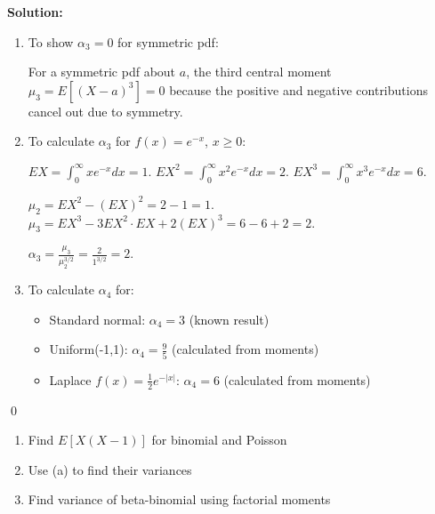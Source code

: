 \noindent\textbf{Solution:}
\begin{enumerate}[label=(\alph*)]
    \item To show $\alpha_3=0$ for symmetric pdf:
    
    For a symmetric pdf about $a$, the third central moment $\mu_3 = E[(X-a)^3] = 0$ because the positive and negative contributions cancel out due to symmetry.
    
    \item To calculate $\alpha_3$ for $f(x)=e^{-x}$, $x\geq0$:
    
    $EX = \int_0^\infty xe^{-x}dx = 1$.
    $EX^2 = \int_0^\infty x^2e^{-x}dx = 2$.
    $EX^3 = \int_0^\infty x^3e^{-x}dx = 6$.
    
    $\mu_2 = EX^2 - (EX)^2 = 2 - 1 = 1$.
    $\mu_3 = EX^3 - 3EX^2 \cdot EX + 2(EX)^3 = 6 - 6 + 2 = 2$.
    
    $\alpha_3 = \frac{\mu_3}{\mu_2^{3/2}} = \frac{2}{1^{3/2}} = 2$.
    
    \item To calculate $\alpha_4$ for:
    \begin{itemize}
        \item Standard normal: $\alpha_4 = 3$ (known result)
        \item Uniform(-1,1): $\alpha_4 = \frac{9}{5}$ (calculated from moments)
        \item Laplace $f(x)=\frac{1}{2}e^{-|x|}$: $\alpha_4 = 6$ (calculated from moments)
    \end{itemize}
\end{enumerate}


\qed
\begin{problembox}
\begin{enumerate}[label=(\alph*)]
    \item Find $E[X(X-1)]$ for binomial and Poisson
    \item Use (a) to find their variances
    \item Find variance of beta-binomial using factorial moments
\end{enumerate}
\end{problembox}

